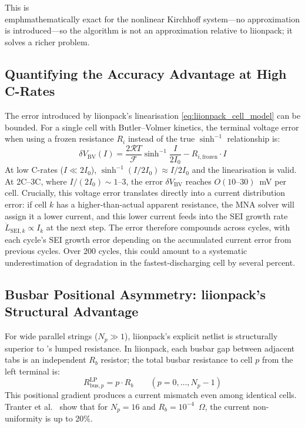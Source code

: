 This is \\emph{mathematically exact} for the nonlinear Kirchhoff system---no approximation is introduced---so the \VIBE{} algorithm is not an approximation relative to liionpack; it solves a richer problem.

\subsection{Quantifying the Accuracy Advantage at High C-Rates}
\label{ssec:accuracy_high_c}

The error introduced by liionpack's linearisation \cref{eq:liionpack_cell_model} can be bounded. For a single cell with Butler--Volmer kinetics, the terminal voltage error when using a frozen resistance $R_i$ instead of the true $\sinh^{-1}$ relationship is:
\begin{equation}
  \delta V_\text{BV}(I) = \frac{2\mathcal{R}T}{\mathcal{F}}\sinh^{-1}\!\frac{I}{2I_0}
    - R_{i,\text{frozen}} \cdot I
  \label{eq:bv_error}
\end{equation}
At low C-rates ($I \ll 2I_0$), $\sinh^{-1}(I/2I_0) \approx I/2I_0$ and the linearisation is valid. At 2C--3C, where $I/(2I_0) \sim 1$--$3$, the error $\delta V_\text{BV}$ reaches $O(10\text{--}30)$~mV per cell. Crucially, this voltage error translates directly into a current distribution error: if cell $k$ has a higher-than-actual apparent resistance, the MNA solver will assign it a lower current, and this lower current feeds into the SEI growth rate $\dot{L}_{\text{SEI},k} \propto I_k$ at the next step. The error therefore compounds across cycles, with each cycle's SEI growth error depending on the accumulated current error from previous cycles. Over 200 cycles, this could amount to a systematic underestimation of degradation in the fastest-discharging cell by several percent.

\subsection{Busbar Positional Asymmetry: liionpack's Structural Advantage}
\label{ssec:busbar_asymmetry}

For wide parallel strings ($N_p \gg 1$), liionpack's explicit netlist is structurally superior to \VIBE{}'s lumped resistance. In liionpack, each busbar gap between adjacent tabs is an independent $R_b$ resistor; the total busbar resistance to cell $p$ from the left terminal is:
\begin{equation}
  R_{\text{bus},p}^\text{LP} = p \cdot R_b \qquad (p = 0, \ldots, N_p-1)
  \label{eq:busbar_positional}
\end{equation}
This positional gradient produces a current mismatch even among identical cells. Tranter et al.~\cite{Tranter2022} show that for $N_p = 16$ and $R_b = 10^{-4}$~$\Omega$, the current non-uniformity is up to 20\%.

